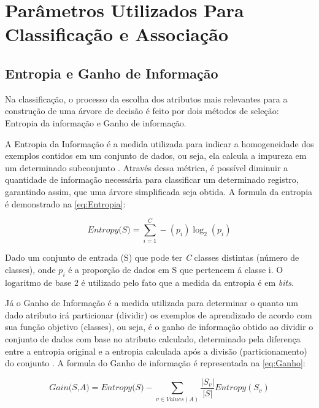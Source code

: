 
\section{Parâmetros Utilizados Para Classificação e Associação}

\subsection{Entropia e Ganho de Informação}

\par
Na classificação, o processo da escolha dos atributos mais relevantes para a construção de uma árvore de decisão é feito por dois métodos de seleção: Entropia da informação e Ganho de informação.

\par
A Entropia da Informação é a medida utilizada para indicar a homogeneidade dos exemplos contidos em um conjunto de dados, ou seja, ela calcula a impureza em um determinado subconjunto \cite{Carvalho2014}. Através dessa métrica, é possível diminuir a quantidade de informação necessária para classificar um determinado registro, garantindo assim, que uma árvore simplificada seja obtida. A formula da entropia é demonstrado na \autoref{eq:Entropia}:

\begin{equation}
    \label{eq:Entropia}
        {\textit{Entropy(S)}={\sum_{i=1}^{C} -(p_i)\log_{2}(p_i)}}
\end{equation}

Dado um conjunto de entrada (S) que pode ter \textit{C} classes distintas (número de classes), onde $p_i$ é a proporção de dados em S que pertencem á classe i. O logaritmo de base 2 é utilizado pelo fato que a medida da entropia é em \textit{bits}.

\par
Já o Ganho de Informação é a medida utilizada para determinar o quanto um dado atributo irá particionar (dividir) os exemplos de aprendizado de acordo com sua função objetivo (classes), ou seja, é o ganho de informação obtido ao dividir o conjunto de dados com base no atributo calculado, determinado pela diferença entre a entropia original e a entropia calculada após a divisão (particionamento) do conjunto \cite{Carvalho2014, Steiner2004}. A formula do Ganho de informação é representada na \autoref{eq:Ganho}:

\begin{equation}
    \label{eq:Ganho}
        {\textit{Gain(S,A)}={\textit{Entropy(S)} -  \sum_{v \in Values(A)} \frac{|S_v|}{|S|} Entropy(S_v) } }
\end{equation}

